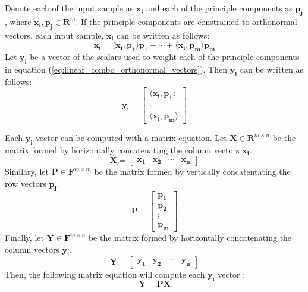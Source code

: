 \documentclass[conference]{IEEEtran}
\begin{document}
    Denote each of the input sample as $\mathbf{x_i}$ and each of the principle components as $\mathbf{p_j}$, where $\mathbf{x_i}, \mathbf{p_j} \in \mathbf{R}^{m}$. If the principle components are constrained to orthonormal vectors, each input sample, $\mathbf{x_i}$ can be written as follows:
    \begin{equation}
    		\mathbf{x_i} = \langle \mathbf{x_i}, \mathbf{p_1} \rangle \mathbf{p_1} + \cdots + \langle \mathbf{x_i}, \mathbf{p_m} \rangle \mathbf{p_m}
    		\label{eq:linear_combo_orthonormal_vectors}
    	\end{equation}
    	Let $\mathbf{y_i}$ be a vector of the scalars used to weight each of the principle components in equation (\ref{eq:linear_combo_orthonormal_vectors}). Then $\mathbf{y_i}$ can be written as follows:
    	\begin{equation}
        \mathbf{y_i} = \begin{bmatrix}
                        \langle \mathbf{x_i}, \mathbf{p_1} \rangle\\
                        \vdots \\
                        \langle \mathbf{x_i}, \mathbf{p_m}\rangle
                        \end{bmatrix}
    \end{equation}
    
    	Each $\mathbf{y_i}$ vector can be computed with a matrix equation. Let $\mathbf{X} \in \mathbf{R}^{m \times n}$ be the matrix formed by horizontally concatenating the column vectors $\mathbf{x_i}$.
    \begin{equation}
    		\mathbf{X} = \begin{bmatrix}
    			\mathbf{x_1} & \mathbf{x_2} & \cdots & \mathbf{x_n}
    		\end{bmatrix}
    	\end{equation}
    	Similary, let $\mathbf{P} \in \mathbf{F}^{m \times m}$ be the matrix formed by vertically concatentating the row vectors $\mathbf{p_j}$.
	\begin{equation}
    		\mathbf{P} = \begin{bmatrix}
    			\mathbf{p_1} \\ \mathbf{p_2} \\ \vdots \\ \mathbf{p_m}
    		\end{bmatrix}
    	\end{equation}
    	Finally, let $\mathbf{Y} \in \mathbf{F}^{m \times n}$ be the matrix formed by horizontally concatenating the column vectors $\mathbf{y_i}$.
    \begin{equation}
    		\mathbf{Y} = \begin{bmatrix}
    			\mathbf{y_1} & \mathbf{y_2} & \cdots & \mathbf{y_n}
    		\end{bmatrix}
    	\end{equation}
    	Then, the following matrix equation will compute each $\mathbf{y_i}$ vector \cite{shlens_2014_tutorial}:
    	\begin{equation}
    		\mathbf{Y} = \mathbf{P}\mathbf{X}
    	\end{equation}
    	
\end{document}
